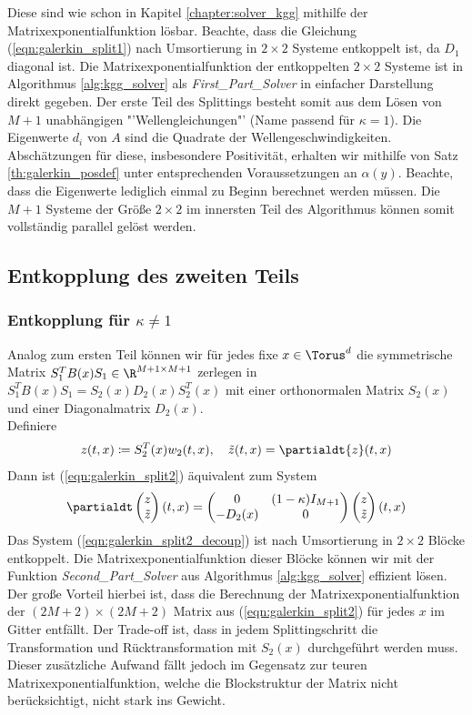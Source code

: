 Diese sind wie schon in Kapitel \ref{chapter:solver_kgg} mithilfe der Matrixexponentialfunktion lösbar. Beachte, dass die Gleichung (\ref{eqn:galerkin_split1}) nach Umsortierung in $2\times 2$ Systeme entkoppelt ist, da $D_1$ diagonal ist. Die Matrixexponentialfunktion der entkoppelten $2\times 2$ Systeme ist in Algorithmus \ref{alg:kgg_solver} als \emph{First\_Part\_Solver} in einfacher Darstellung direkt gegeben. Der erste Teil des Splittings besteht somit aus dem Lösen von $M+1$ unabhängigen "'Wellengleichungen"' (Name passend für $\kappa=1$). Die Eigenwerte $d_i$ von $A$ sind die Quadrate der Wellengeschwindigkeiten. Abschätzungen für diese, insbesondere Positivität, erhalten wir mithilfe von Satz \ref{th:galerkin_posdef} unter entsprechenden Voraussetzungen an $\alpha(y)$. Beachte, dass die Eigenwerte lediglich einmal zu Beginn berechnet werden müssen. Die $M+1$ Systeme der Größe $2\times 2$ im innersten Teil des Algorithmus können somit vollständig parallel gelöst werden.

\subsection{Entkopplung des zweiten Teils}
\subsubsection*{Entkopplung für $\kappa \neq 1$}
Analog zum ersten Teil können wir für jedes fixe $x\in\Torus^d$ die symmetrische Matrix $S_1^TB(x)S_1\in\R^{M+1\times M+1}$ zerlegen in $S_1^TB(x)S_1=S_2(x)D_2(x)S_2^T(x)$ mit einer orthonormalen Matrix $S_2(x)$ und einer Diagonalmatrix $D_2(x)$.\\
Definiere
\[z(t,x)\coloneqq S_2^T(x) w_2(t,x), \quad \tilde{z}(t,x)=\partialdt{z}(t,x)\]
Dann ist (\ref{eqn:galerkin_split2}) äquivalent zum System
\begin{equation}
\label{eqn:galerkin_split2_decoup}
\partialdt\begin{pmatrix}z\\ \tilde{z}\end{pmatrix}(t,x)=\begin{pmatrix}0&(1-\kappa)I_{M+1}\\-D_2(x) & 0\end{pmatrix}\begin{pmatrix}z\\\tilde{z}\end{pmatrix}(t,x)
\end{equation}
Das System (\ref{eqn:galerkin_split2_decoup}) ist nach Umsortierung in $2\times 2$ Blöcke entkoppelt. Die Matrixexponentialfunktion dieser Blöcke können wir mit der Funktion \emph{Second\_Part\_Solver} aus Algorithmus \ref{alg:kgg_solver} effizient lösen. Der große Vorteil hierbei ist, dass die Berechnung der Matrixexponentialfunktion der $(2M+2)\times (2M+2)$ Matrix aus (\ref{eqn:galerkin_split2}) für jedes $x$ im Gitter entfällt. Der Trade-off ist, dass in jedem Splittingschritt die Transformation und Rücktransformation mit $S_2(x)$ durchgeführt werden muss. Dieser zusätzliche Aufwand fällt jedoch im Gegensatz zur teuren Matrixexponentialfunktion, welche die Blockstruktur der Matrix nicht berücksichtigt, nicht stark ins Gewicht.
